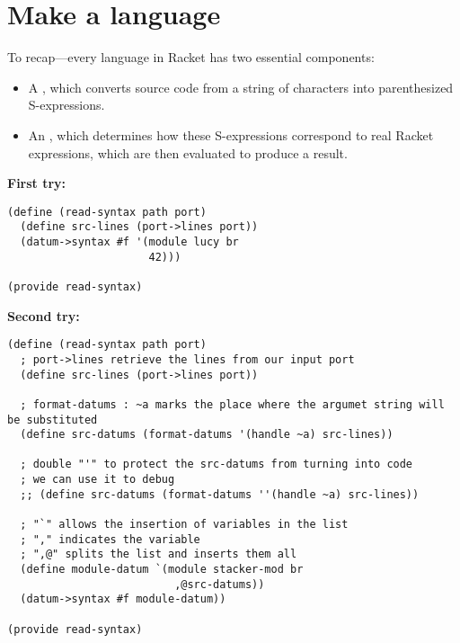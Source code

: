\section{Make a language}

To recap—every language in Racket has two essen­tial compo­nents:
\begin{itemize}
  \item A , which converts source code from a string of 
    char­ac­ters into paren­the­sized S-expres­sions.
  \item An , which deter­mines how these S-expres­sions 
    cor­re­spond to real Racket expres­sions, which are then eval­u­ated to 
    pro­duce a result.
\end{itemize}

\textbf{First try:}
\begin{lstlisting}[language=racket]
(define (read-syntax path port)
  (define src-lines (port->lines port))
  (datum->syntax #f '(module lucy br
                      42)))

(provide read-syntax)
\end{lstlisting}

\textbf{Second try:}
\begin{lstlisting}[language=racket]
(define (read-syntax path port)
  ; port->lines retrieve the lines from our input port
  (define src-lines (port->lines port))

  ; format-datums : ~a marks the place where the argumet string will be substituted
  (define src-datums (format-datums '(handle ~a) src-lines))

  ; double "'" to protect the src-datums from turning into code
  ; we can use it to debug
  ;; (define src-datums (format-datums ''(handle ~a) src-lines))

  ; "`" allows the insertion of variables in the list
  ; "," indicates the variable
  ; ",@" splits the list and inserts them all
  (define module-datum `(module stacker-mod br
                          ,@src-datums))
  (datum->syntax #f module-datum))

(provide read-syntax)
\end{lstlisting}

